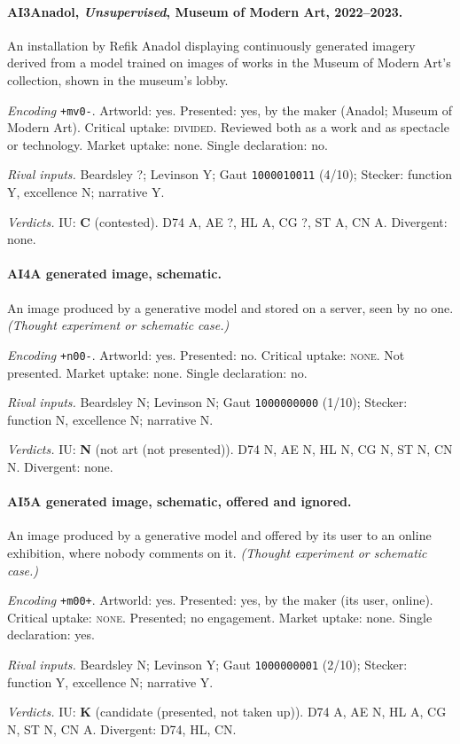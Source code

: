 \paragraph{AI3\enspace Anadol, \emph{Unsupervised}, Museum of Modern Art, 2022--2023.}
An installation by Refik Anadol displaying continuously generated imagery derived from a model trained on images of works in the Museum of Modern Art's collection, shown in the museum's lobby.\par
\noindent\textit{Encoding} \texttt{+mv0-}. Artworld: yes. Presented: yes, by the maker (Anadol; Museum of Modern Art). Critical uptake: \textsc{divided}. Reviewed both as a work and as spectacle or technology. Market uptake: none. Single declaration: no.\par
\noindent\textit{Rival inputs.} Beardsley ?; Levinson Y; Gaut \texttt{1000010011} (4/10); Stecker: function Y, excellence N; narrative Y.\par
\noindent\textit{Verdicts.} IU: \textbf{C} (contested). D74 A, AE ?, HL A, CG ?, ST A, CN A. Divergent: none.\par

\paragraph{AI4\enspace A generated image, schematic.}
An image produced by a generative model and stored on a server, seen by no one. \textit{(Thought experiment or schematic case.)}\par
\noindent\textit{Encoding} \texttt{+n00-}. Artworld: yes. Presented: no. Critical uptake: \textsc{none}. Not presented. Market uptake: none. Single declaration: no.\par
\noindent\textit{Rival inputs.} Beardsley N; Levinson N; Gaut \texttt{1000000000} (1/10); Stecker: function N, excellence N; narrative N.\par
\noindent\textit{Verdicts.} IU: \textbf{N} (not art (not presented)). D74 N, AE N, HL N, CG N, ST N, CN N. Divergent: none.\par

\paragraph{AI5\enspace A generated image, schematic, offered and ignored.}
An image produced by a generative model and offered by its user to an online exhibition, where nobody comments on it. \textit{(Thought experiment or schematic case.)}\par
\noindent\textit{Encoding} \texttt{+m00+}. Artworld: yes. Presented: yes, by the maker (its user, online). Critical uptake: \textsc{none}. Presented; no engagement. Market uptake: none. Single declaration: yes.\par
\noindent\textit{Rival inputs.} Beardsley N; Levinson Y; Gaut \texttt{1000000001} (2/10); Stecker: function Y, excellence N; narrative Y.\par
\noindent\textit{Verdicts.} IU: \textbf{K} (candidate (presented, not taken up)). D74 A, AE N, HL A, CG N, ST N, CN A. Divergent: D74, HL, CN.\par

